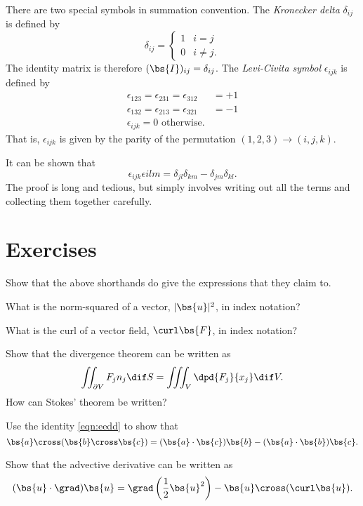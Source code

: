 \documentclass{article}
\begin{document}
There are two special symbols in summation convention. The \textit{Kronecker delta} $\delta_{ij}$ is defined by
\begin{equation}
 \delta_{ij} = \begin{cases}
  1 & i = j \\
  0 & i\neq j.
 \end{cases}
\end{equation}
The identity matrix is therefore $(\bs{I})_{ij} = \delta_{ij}$. The \textit{Levi-Civita symbol} $\epsilon_{ijk}$ is defined by 
\begin{align}
    \epsilon_{123} = \epsilon_{231} = \epsilon_{312} &= +1 \\
    \epsilon_{132} = \epsilon_{213} = \epsilon_{321} &= -1 \\
    \epsilon_{ijk} = 0 \text{ otherwise.}
\end{align}
That is, $\epsilon_{ijk}$ is given by the parity of the permutation $(1,2,3)\rightarrow(i,j,k)$. 

It can be shown that 
\begin{equation} \label{eqn:eedd}
 \epsilon_{ijk}\epsilon{ilm} = \delta_{jl}\delta_{km} - \delta_{jm}\delta_{kl}. 
\end{equation}
The proof is long and tedious, but simply involves writing out all the terms and collecting them together carefully. 

\section*{Exercises}

Show that the above shorthands do give the expressions that they claim to.

What is the norm-squared of a vector, $|\bs{u}|^2$, in index notation?

What is the curl of a vector field, $\curl\bs{F}$, in index notation?

Show that the divergence theorem can be written as
$$ \iint_{\partial V} F_j n_j \dif S = \iiint_V \dpd{F_j}{x_j} \dif V. $$
How can Stokes' theorem be written?

Use the identity \ref{eqn:eedd} to show that
$$ \bs{a}\cross(\bs{b}\cross\bs{c}) = (\bs{a}\cdot\bs{c})\bs{b} - (\bs{a}\cdot\bs{b})\bs{c}. $$

Show that the advective derivative can be written as 
$$ (\bs{u}\cdot\grad)\bs{u} = \grad\left(\frac{1}{2}\bs{u}^2\right) - \bs{u}\cross(\curl\bs{u}). $$
\end{document}
